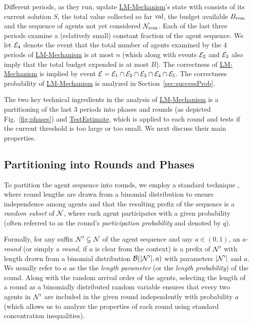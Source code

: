 Different periods, as they run, update \hyperref[alg:LMMECH]{LM-Mechanism}'s state with consists of its current solution $S$, the total value collected so far $\text{val}$, the budget available $B_{\text{rem}}$ and the sequence of agents not yet considered $\mathcal{N}_{\text{rem}}$. 
%
Each of the last three periods examine a (relatively small) constant fraction of the agent sequence. We let $\mathcal{E}_4$ denote the event that the total number of agents examined by the $4$ periods of \hyperref[alg:LMMECH]{LM-Mechanism} is at most $n$ (which along with events $\mathcal{E}_2$ and $\mathcal{E}_3$ also imply that the total budget expended is at most $B$). The correctness of \hyperref[alg:LMMECH]{LM-Mechanism} is implied by event $\mathcal{E} = \mathcal{E}_1 \cap \mathcal{E}_2 \cap \mathcal{E}_3 \cap \mathcal{E}_4 \cap \mathcal{E}_5$. The correctness probability of \hyperref[alg:LMMECH]{LM-Mechanism} is analyzed in Section~\ref{sec:successProb}.


The two key technical ingredients in the analysis of \hyperref[alg:LMMECH]{LM-Mechanism} is a partitioning of the last $3$ periods into phases and rounds (as depicted Fig.~\ref{fig:phases}) and \hyperref[alg:TestTHRESHOLD]{TestEstimate}, which is applied to each round and tests if the current threshold is too large or too small. 
%
%
We next discuss their main properties. 


\subsection{Partitioning into Rounds and Phases}
\label{sec:rounds}

To partition the agent sequence into rounds, we employ a standard technique \cite{IndependentTrick}, where round lengths are drawn from a binomial distribution to ensure independence among agents and that the resulting prefix of the sequence is a \emph{random subset} of $\mathcal{N}$, where each agent participates with a given probability (often referred to as the round's \emph{participation probability} and denoted by $q$). 

Formally, for any suffix $\mathcal{N}' \subseteq \mathcal{N}$ of the agent sequence and any $a \in (0, 1)$, an \emph{$a$-round} (or simply a \emph{round}, if $a$ is clear from the context) is a prefix of $\mathcal{N}'$ with length drawn from a binomial distribution $\mathcal{B}(|\mathcal{N}'|, a)$ with parameters $|\mathcal{N}'|$ and $a$. We usually refer to $a$ as the the \emph{length parameter} (or the \emph{length probability}) of the round. 
%
Along with the random arrival order of the agents, selecting the length of a round as a binomially distributed random variable ensures that every two agents in $\mathcal{N}'$ are included in the given round independently with probability $a$ (which allows us to analyze the properties of each round using standard concentration inequalities). 

